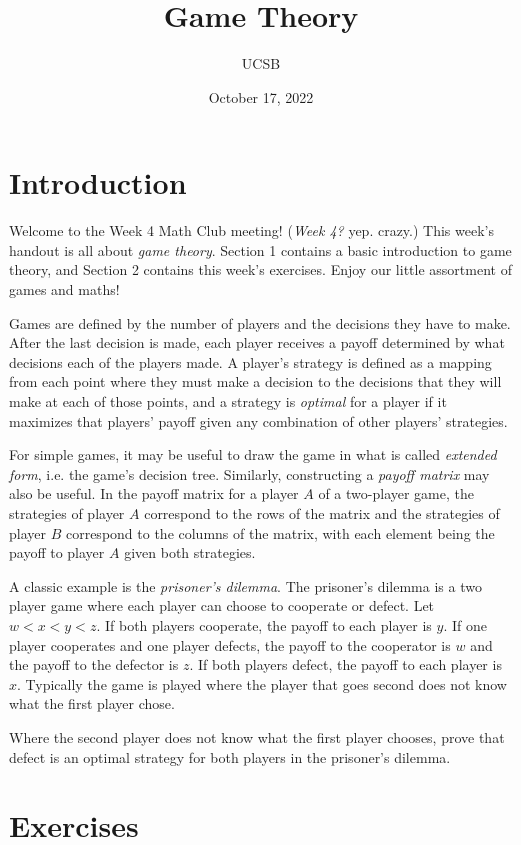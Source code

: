 \documentclass{article}
\title{Game Theory}
\author{UCSB}
\date{October 17, 2022}
\begin{document}
\section{Introduction}
Welcome to the Week 4 Math Club meeting!
(\emph{Week 4?} yep. crazy.)
This week's handout is all about \emph{game theory}.
Section 1 contains a basic introduction to game theory, and Section 2 contains this week's exercises. 
Enjoy our little assortment of games and maths!

Games are defined by the number of players and the decisions they have to make.
After the last decision is made, each player receives a payoff determined by what decisions each of the players made.
A player's strategy is defined as a mapping from each point where they must make a decision to the decisions that they will make at each of those points, and a strategy is \emph{optimal} for a player if it maximizes that players' payoff given any combination of other players' strategies.

For simple games, it may be useful to draw the game in what is called \emph{extended form}, i.e. the game's decision tree.
Similarly, constructing a \emph{payoff matrix} may also be useful.
In the payoff matrix for a player $A$ of a two-player game, the strategies of player $A$ correspond to the rows of the matrix and the strategies of player $B$ correspond to the columns of the matrix, with each element being the payoff to player $A$ given both strategies.

A classic example is the \emph{prisoner's dilemma}.
The prisoner's dilemma is a two player game where each player can choose to cooperate or defect.
Let $w<x<y<z$.
If both players cooperate, the payoff to each player is $y$.
If one player cooperates and one player defects, the payoff to the cooperator is $w$ and the payoff to the defector is $z$.
If both players defect, the payoff to each player is $x$.
Typically the game is played where the player that goes second does not know what the first player chose.

\begin{exercise}
    Where the second player does not know what the first player chooses, prove that defect is an optimal strategy for both players in the prisoner's dilemma.
\end{exercise}

\section{Exercises}
\end{document}
